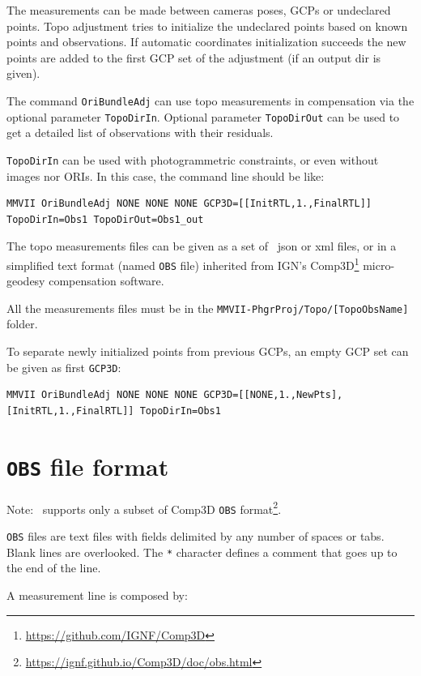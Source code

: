 The measurements can be made between cameras poses, GCPs or undeclared points.
Topo adjustment tries to initialize the undeclared points based on known points and observations.
If automatic coordinates initialization succeeds the new points are added to the first GCP set of the adjustment
(if an output dir is given).

The command \texttt{OriBundleAdj} can use topo measurements in compensation via the optional parameter \texttt{TopoDirIn}. Optional parameter \texttt{TopoDirOut} can be used to get a detailed list of observations with their residuals.

\texttt{TopoDirIn} can be used with photogrammetric constraints, or even without images nor ORIs.
In this case, the command line should be like:

\begin{lstlisting}
MMVII OriBundleAdj NONE NONE NONE GCP3D=[[InitRTL,1.,FinalRTL]] TopoDirIn=Obs1 TopoDirOut=Obs1_out
\end{lstlisting}

The topo measurements files can be given as a set of \CdPPP\ json or xml files, or in a simplified text format (named \texttt{OBS} file) inherited from IGN's
Comp3D\footnote{\url{https://github.com/IGNF/Comp3D}} micro-geodesy compensation software.

All the measurements files must be in the \texttt{MMVII-PhgrProj/Topo/[TopoObsName]} folder.

To separate newly initialized points from previous GCPs, an empty GCP set can be given as first \texttt{GCP3D}:
\begin{lstlisting}
MMVII OriBundleAdj NONE NONE NONE GCP3D=[[NONE,1.,NewPts], [InitRTL,1.,FinalRTL]] TopoDirIn=Obs1
\end{lstlisting}


\section{\texttt{OBS} file format}
\label{sec:compObsFormat}

Note: \CdPPP\ supports only a subset of Comp3D \texttt{OBS} format\footnote{\url{https://ignf.github.io/Comp3D/doc/obs.html}}.

\texttt{OBS} files are text files with fields delimited by any number of spaces or tabs. Blank lines are overlooked.
The \texttt{*} character defines a comment that goes up to the end of the line.

A measurement line is composed by:

